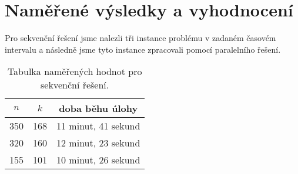 \documentclass[12pt]{article}
\begin{document}
\section{Naměřené výsledky a vyhodnocení}

Pro sekvenční řešení jsme nalezli tři instance problému v zadaném časovém intervalu a 
následně jsme tyto instance zpracovali pomocí paralelního řešení. 

\begin{table}[ht]
  \begin{center}
    \begin{tabular}{| c | c | c |}
      \hline
      $n$ & $k$ & doba běhu úlohy \\ \hline
      350 & 168 & 11 minut, 41 sekund \\ \hline
      320 & 160 & 12 minut, 23 sekund \\ \hline
      155 & 101 & 10 minut, 26 sekund \\
      \hline
    \end{tabular}
    \caption{Tabulka naměřených hodnot pro sekvenční řešení.}
  \end{center}
\end{table}
\end{document}

